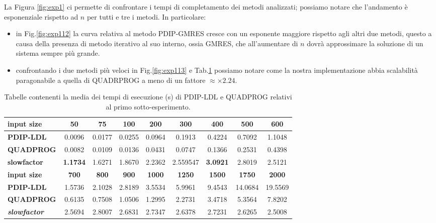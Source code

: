 La Figura \ref{fig:exp1} ci permette di confrontare i tempi di completamento dei metodi analizzati; possiamo notare che l'andamento è esponenziale rispetto ad $n$ per tutti e tre i metodi.
In particolare:
\begin{itemize}
    \item in Fig.\ref{fig:exp112} la curva relativa al metodo PDIP-GMRES cresce con un esponente maggiore rispetto agli altri due metodi, questo a causa della presenza di metodo iterativo al suo interno, ossia GMRES, che all'aumentare di $n$ dovrà approssimare la soluzione di un sistema sempre più grande.
    
    \item confrontando i due metodi più veloci in Fig.\ref{fig:exp113} e Tab.\ref{tab:ldlqp2} possiamo notare come la nostra implementazione abbia scalabilità paragonabile a quella di QUADRPROG a meno di un fattore $\approx\times2.24$.

\end{itemize}

\begin{table}[!h]
\centering
\begin{tabular}{|l|c|c|c|c|c|c|c|c|}
\hline \textbf{input size}                  & \textbf{50}  & \textbf{75}  & \textbf{100} & \textbf{200}  & \textbf{300}  & \textbf{400}  & \textbf{500}  & \textbf{600}  \\\hline
\textbf{PDIP-LDL}                    & 0.0096       & 0.0177       & 0.0255       & 0.0964        & 0.1913        & 0.4224        & 0.7092        & 1.1048        \\
\textbf{QUADPROG}                    & 0.0082       & 0.0109       & 0.0136       & 0.0431        & 0.0747        & 0.1366        & 0.2531        & 0.4398        \\
\textbf{slowfactor} & \textbf{1.1734}       & 1.6271       & 1.8670       & 2.2362        & 2.559547        & \textbf{3.0921}        & 2.8019        & 2.5121        \\ \hline
\textbf{input size}                  & \textbf{700} & \textbf{800} & \textbf{900} & \textbf{1000} & \textbf{1250} & \textbf{1500} & \textbf{1750} & \textbf{2000} \\\hline
\textbf{PDIP-LDL}                    & 1.5736       & 2.1028       & 2.8189       & 3.5534        & 5.9961        & 9.4543        & 14.0684        & 19.5569       \\
\textbf{QUADPROG}                    & 0.6135       & 0.7508       & 1.0506       & 1.2995        & 2.2731        & 3.4718        & 5.3564        & 7.8202        \\
\textbf{\textit{slowfactor}} & 2.5694       & 2.8007       & 2.6831       & 2.7347        & 2.6378        & 2.7231        & 2.6265        & 2.5008  \\\hline     
\end{tabular}
    \caption{Tabelle contenenti la media dei tempi di esecuzione (s) di PDIP-LDL e QUADPROG relativi al primo sotto-esperimento. \label{tab:ldlqp2}}
    \end{table}
   
